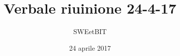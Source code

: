 


\usepackage{ragged2e}

\title{\textbf{Verbale riuinione 24-4-17}}
\author{SWEetBIT}

\date{24 aprile 2017}




\makeFrontPage

\tableofcontents





